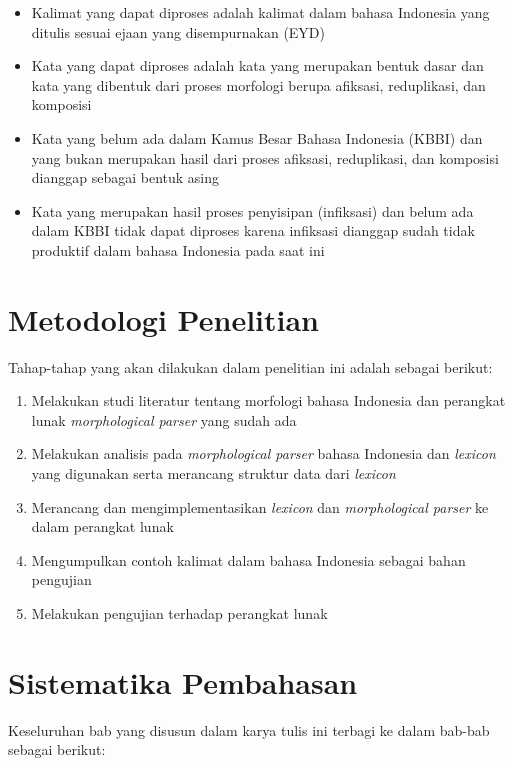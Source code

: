 \begin{itemize}
	\item Kalimat yang dapat diproses adalah kalimat dalam bahasa Indonesia yang ditulis sesuai ejaan yang disempurnakan (EYD)
	\item Kata yang dapat diproses adalah kata yang merupakan bentuk dasar dan kata yang dibentuk dari proses morfologi berupa afiksasi, reduplikasi, dan komposisi
	\item Kata yang belum ada dalam Kamus Besar Bahasa Indonesia (KBBI) dan yang bukan merupakan hasil dari proses afiksasi, reduplikasi, dan komposisi dianggap sebagai bentuk asing
	\item Kata yang merupakan hasil proses penyisipan (infiksasi) dan belum ada dalam KBBI tidak dapat diproses karena infiksasi dianggap sudah tidak produktif dalam bahasa Indonesia pada saat ini
\end{itemize}

\section{Metodologi Penelitian}
\label{sec:metodologiPenelitian}

Tahap-tahap yang akan dilakukan dalam penelitian ini adalah sebagai berikut:
\begin{enumerate}
	\item Melakukan studi literatur tentang morfologi bahasa Indonesia dan perangkat lunak {\it morphological parser} yang sudah ada
	\item Melakukan analisis pada {\it morphological parser} bahasa Indonesia dan {\it lexicon} yang digunakan serta merancang struktur data dari {\it lexicon}
	\item Merancang dan mengimplementasikan {\it lexicon} dan {\it morphological parser} ke dalam perangkat lunak
	\item Mengumpulkan contoh kalimat dalam bahasa Indonesia sebagai bahan pengujian
	\item Melakukan pengujian terhadap perangkat lunak
\end{enumerate}

\section{Sistematika Pembahasan}
\label{sec:sistematikaPembahasan}

Keseluruhan bab yang disusun dalam karya tulis ini terbagi ke dalam bab-bab sebagai berikut:

